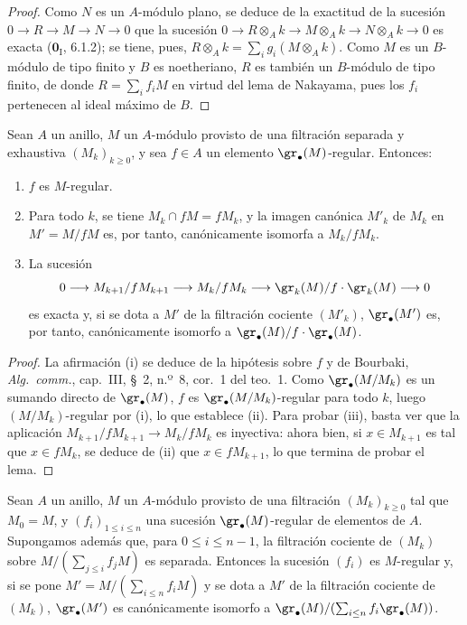\begin{proof}
Como $N$ es un $A$-módulo plano, se deduce de la exactitud de la sucesión
$0\to R\to M\to N\to0$ que la sucesión
$0\to R\otimes_A k\to M\otimes_A k\to N\otimes_A k\to0$
es exacta ($\mathbf{0}_{\mathrm I}$, 6.1.2); se tiene, pues,
$R\otimes_A k=\sum_i g_i(M\otimes_A k)$. Como $M$ es un $B$-módulo de tipo
finito y $B$ es noetheriano, $R$ es también un $B$-módulo de tipo finito, de
donde $R=\sum_i f_iM$ en virtud del lema de Nakayama, pues los $f_i$ pertenecen
al ideal máximo de $B$.
\end{proof}

\begin{lemma}[15.1.18]
\label{0.15.1.18-fr}
Sean $A$ un anillo, $M$ un $A$-módulo provisto de una filtración separada y
exhaustiva $(M_k)_{k\geq0}$, y sea $f\in A$ un elemento
$\gr_\bullet(M)$-regular. Entonces:
\begin{enumerate}
  \item[\textup{(i)}] $f$ es $M$-regular.
  \item[\textup{(ii)}] Para todo $k$, se tiene $M_k\cap fM=fM_k$, y la imagen canónica
  $M'_k$ de $M_k$ en $M'=M/fM$ es, por tanto, canónicamente isomorfa a
  $M_k/fM_k$.
  \item[\textup{(iii)}] La sucesión
  \[
    0\longrightarrow M_{k+1}/fM_{k+1}\longrightarrow M_k/fM_k
    \longrightarrow\gr_k(M)/f\cdot\gr_k(M)\longrightarrow0
  \]
  es exacta y, si se dota a $M'$ de la filtración cociente $(M'_k)$,
  $\gr_\bullet(M')$ es, por tanto, canónicamente isomorfo a
  $\gr_\bullet(M)/f\cdot\gr_\bullet(M)$.
\end{enumerate}
\end{lemma}

\begin{proof}
La afirmación (i) se deduce de la hipótesis sobre $f$ y de Bourbaki,
\emph{Alg.~comm.}, cap.~III, \S~2, n.º~8, cor.~1 del teo.~1. Como
$\gr_\bullet(M/M_k)$ es un sumando directo de $\gr_\bullet(M)$, $f$ es
$\gr_\bullet(M/M_k)$-regular para todo $k$, luego $(M/M_k)$-regular por (i),
lo que establece (ii). Para probar (iii), basta ver que la aplicación
$M_{k+1}/fM_{k+1}\to M_k/fM_k$ es inyectiva: ahora bien, si
$x\in M_{k+1}$ es tal que $x\in fM_k$, se deduce de (ii) que
$x\in fM_{k+1}$, lo que termina de probar el lema.
\end{proof}

\begin{proposition}[15.1.19]
\label{0.15.1.19-fr}
Sean $A$ un anillo, $M$ un $A$-módulo provisto de una filtración
$(M_k)_{k\geq0}$ tal que $M_0=M$, y $(f_i)_{1\leq i\leq n}$ una sucesión
$\gr_\bullet(M)$-regular de elementos de $A$. Supongamos además que, para
$0\leq i\leq n-1$, la filtración cociente de $(M_k)$ sobre
$M/(\sum_{j\leq i}f_jM)$
es separada. Entonces la sucesión $(f_i)$ es $M$-regular y, si se pone
$M'=M/(\sum_{i\leq n}f_iM)$
y se dota a $M'$ de la filtración cociente de $(M_k)$,
$\gr_\bullet(M')$ es canónicamente isomorfo a
$\gr_\bullet(M)/(\sum_{i\leq n}f_i\gr_\bullet(M))$.
\end{proposition}

